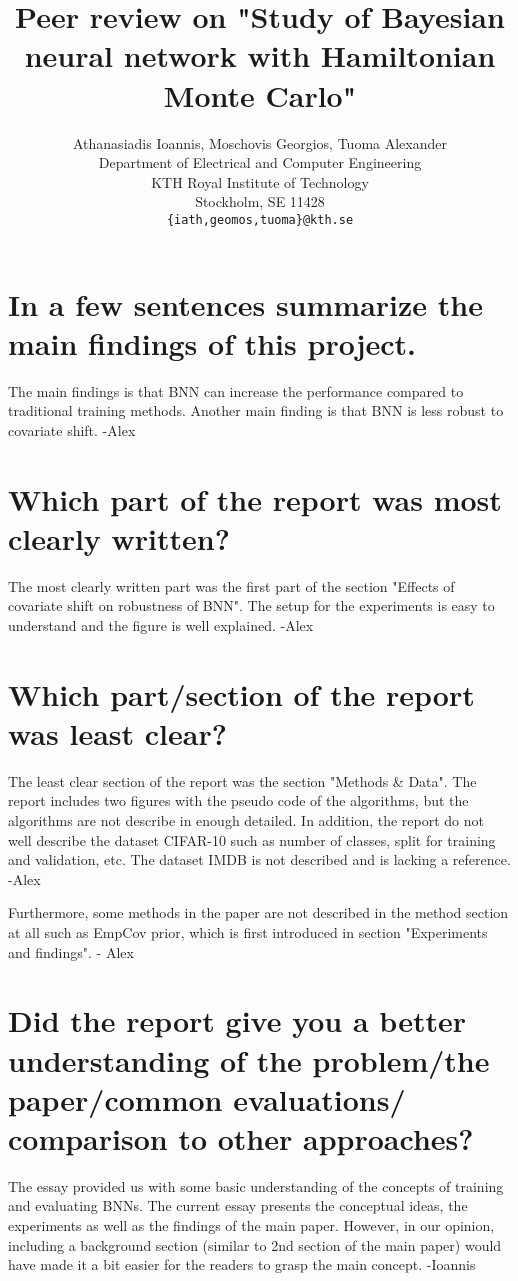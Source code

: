 \documentclass{article}
\title{Peer review on "Study of Bayesian neural network with Hamiltonian Monte Carlo"}
\author{%
   Athanasiadis Ioannis, Moschovis Georgios, Tuoma Alexander \\
  Department of Electrical and Computer Engineering\\
  KTH Royal Institute of Technology\\
  Stockholm, SE 11428 \\
  \texttt{\{iath,geomos,tuoma\}@kth.se} \\
}
\begin{document}
\maketitle

\section{In a few sentences summarize the main findings of this project.}
The main findings is that BNN can increase the performance compared to traditional training methods. Another main finding is that BNN is less robust to covariate shift. -Alex

\section{Which part of the report was most clearly written?}
The most clearly written part was the first part of the section "Effects of covariate shift on robustness of BNN". The setup for the experiments is easy to understand and the figure is well explained. -Alex

\section{Which part/section of the report was least clear?}

The least clear section of the report was the section "Methods & Data". The report includes two figures with the pseudo code of the algorithms, but the algorithms are not describe in enough detailed. In addition, the report do not well describe the dataset CIFAR-10 such as number of classes, split for training and validation, etc. The dataset IMDB is not described and is lacking a reference. -Alex

Furthermore, some methods in the paper are not described in the method section at all such as EmpCov prior, which is first introduced in section "Experiments and findings". - Alex


\section{Did the report give you a better understanding of the problem/the paper/common evaluations/ comparison to other approaches?}
The essay provided us with some basic understanding of the concepts of training and evaluating BNNs. The current essay presents the conceptual ideas, the experiments as well as the findings of the main paper. However, in our opinion, including a background section (similar to 2nd section of the main paper) would have made it a bit easier for the readers to grasp the main concept. -Ioannis
\end{document}
